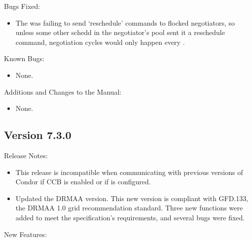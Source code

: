 \noindent Bugs Fixed:

\begin{itemize}

\item The  was failing to send `reschedule' commands to
flocked negotiators, so unless some other schedd in the negotiator's
pool sent it a reschedule command, negotiation cycles would only
happen every .

\end{itemize}

\noindent Known Bugs:

\begin{itemize}

\item None.

\end{itemize}

\noindent Additions and Changes to the Manual:

\begin{itemize}

\item None.

\end{itemize}

\subsection*{\label{sec:New-7-3-0}Version 7.3.0}

\noindent Release Notes:

\begin{itemize}

\item This release is incompatible when communicating with
previous versions of Condor if CCB is enabled or if
 is configured.

\item Updated the DRMAA version.
This new version is compliant with GFD.133,
the DRMAA 1.0 grid recommendation standard.
Three new functions were added to meet the specification's requirements,
and several bugs were fixed.

\end{itemize}


\noindent New Features:

